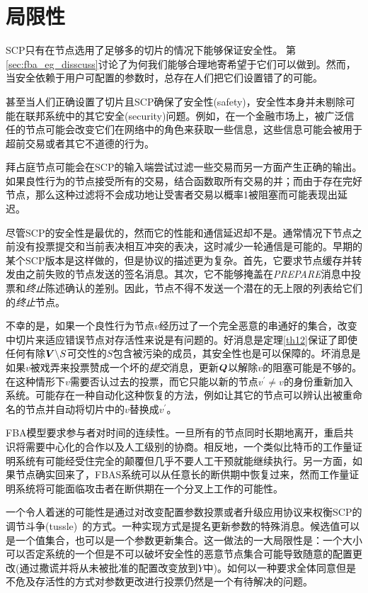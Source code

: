 \section{局限性}\label{sec:limit}

SCP只有在节点选用了足够多的{\quorum}切片的情况下能够保证安全性。	第\ref{sec:fba_eg_disscuss}讨论了为何我们能够合理地寄希望于它们可以做到。然而，当安全依赖于用户可配置的参数时，总存在人们把它们设置错了的可能。

甚至当人们正确设置了{\quorum}切片且SCP确保了安全性(safety)，安全性本身并未剔除可能在联邦系统中的其它安全(security)问题。例如，在一个金融市场上，被广泛信任的节点可能会改变它们在网络中的角色来获取一些信息，这些信息可能会被用于超前交易或者其它不道德的行为。

拜占庭节点可能会在SCP的输入端尝试过滤一些交易而另一方面产生正确的输出。如果良性行为的节点接受所有的交易，结合函数取所有交易的并；而由于存在完好节点，那么这种过滤将不会成功地让受害者交易以概率1被阻塞而可能表现出延迟。

尽管SCP的安全性是最优的，然而它的性能和通信延迟却不是。通常情况下节点之前没有投票提交和当前表决相互冲突的表决，这时减少一轮通信是可能的。早期的某个SCP版本是这样做的，但是协议的描述更为复杂。首先，它要求节点缓存并转发由之前失败的节点发送的签名消息。其次，它不能够掩盖在\textsl{PREPARE}消息中投票和\textit{终止}陈述确认的差别。因此，节点不得不发送一个潜在的无上限的列表给它们的\textit{终止}节点。

不幸的是，如果一个良性行为节点$v$经历过了一个完全恶意的串通好的{\vblock}集合，改变{\slot}中切片来适应错误节点对存活性来说是有问题的。好消息是定理\ref{th12}保证了即使任何有除${\bm V}\backslash S${\quorum}可交性的$S$包含被污染的成员，其安全性也是可以保障的。坏消息是如果$v$被戏弄来投票赞成一个坏的\textit{提交}消息，更新${\bm Q}$以解除$v$的阻塞可能是不够的。在这种情形下$v$需要否认过去的投票，而它只能以新的节点$v^{\prime}\neq v$的身份重新加入系统。可能存在一种自动化这种恢复的方法，例如让其它的节点可以辨认出被重命名的节点并自动将切片中的$v$替换成$v^{\prime}$。

FBA模型要求参与者对时间的连续性。一旦所有的节点同时长期地离开，重启共识将需要中心化的合作以及人工级别的协商。相反地，一个类似比特币的工作量证明系统有可能经受住完全的颠覆但几乎不要人工干预就能继续执行。另一方面，如果节点确实回来了，FBAS系统可以从任意长的断供期中恢复过来，然而工作量证明系统将可能面临攻击者在断供期在一个分叉上工作的可能性。

一个令人着迷的可能性是通过对改变配置参数投票或者升级应用协议来权衡SCP的调节斗争(tussle)~\cite{Clark:2005:TCD:1074047.1074049}的方式。一种实现方式是提名更新参数的特殊消息。候选值可以是一个值集合，也可以是一个参数更新集合。这一做法的一大局限性是：一个大小可以否定系统的一个{\quorum}但是不可以破坏安全性的恶意节点集合可能导致随意的配置更改(通过撒谎并将从未被批准的配置改变放到$Y$中)。如何以一种要求全体{\quorum}同意但是不危及存活性的方式对参数更改进行投票仍然是一个有待解决的问题。